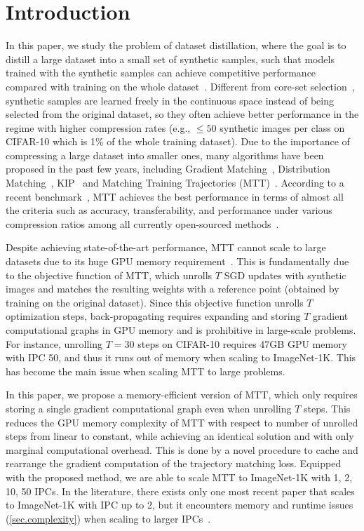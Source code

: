 \documentclass[10pt,twocolumn,letterpaper]{article}
\begin{document}
\section{Introduction}
In this paper, we study the problem of dataset distillation, where the goal is to distill a large dataset into a small set of synthetic samples, such that models trained with the synthetic samples can achieve competitive performance compared with training on the whole dataset~\cite{wang2018dataset}. Different from core-set selection~\cite{wolf2011facility, rebuffi2017icarl, castro2018end}, synthetic samples are learned freely in the continuous space instead of being selected from the original dataset, so they often achieve better performance in the regime with higher compression rates (e.g., $\leq 50$ synthetic images per class on CIFAR-10 which is 1\% of the whole training dataset). Due to the importance of compressing a large dataset into smaller ones, many algorithms have been proposed in the past few years, including Gradient Matching~\cite{zhaodsa}, Distribution Matching~\cite{zhaodm}, KIP~\cite{nguyen2021dataset} and Matching Training Trajectories (MTT)~\cite{cazenavette2022dataset}. 
According to a recent benchmark~\cite{dcbench}, MTT achieves the best performance in terms of almost all the criteria such as accuracy, transferability, and performance under various compression ratios among all currently open-sourced methods~\cite{wang2018dataset,zhaodc,bohdal2020flexible,zhaodsa,zhaodm,wang2022cafe}.


Despite achieving state-of-the-art performance, MTT cannot scale to large datasets due to its huge GPU memory requirement~\cite{zhou2022dataset,cazenavette2022dataset,dcbench}. This is fundamentally due to the objective function of MTT, which unrolls $T$ SGD updates with synthetic images and matches the resulting weights with a reference point (obtained by training on the original dataset). Since this objective function unrolls $T$ optimization steps, back-propagating requires expanding and storing $T$ gradient computational graphs in GPU memory and is prohibitive in large-scale problems. For instance, unrolling $T=30$ steps on CIFAR-10 requires 47GB GPU memory~\cite{cazenavette2022dataset} with IPC 50, and thus it runs out of memory when scaling to ImageNet-1K. This has become the main issue when scaling MTT to large problems.

In this paper, we propose a memory-efficient version of MTT, which only requires storing a single gradient computational graph even when unrolling $T$ steps. This reduces the GPU memory complexity of MTT with respect to number of unrolled steps from linear to constant, while achieving an identical solution and with only marginal computational overhead. This is done by a novel procedure to cache and rearrange the gradient computation of the trajectory matching loss. Equipped with the proposed method, we are able to scale MTT to ImageNet-1K with 1, 2, 10, 50 IPCs. In the literature, there exists only one most recent paper that scales to ImageNet-1K with IPC up to 2, but it encounters memory and runtime issues (\cref{sec.complexity}) when scaling to larger IPCs~\cite{zhou2022dataset}.
\end{document}
